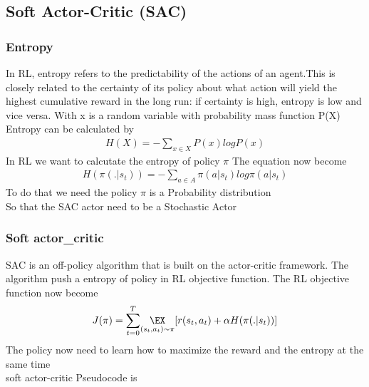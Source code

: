 \subsection{Soft Actor-Critic (SAC)}
\subsubsection{Entropy}
    In RL, entropy refers to the predictability of the actions of an agent.This is closely related to the certainty of its policy about what action will yield the highest cumulative reward in the long run: if certainty is high, entropy is low and vice versa. With x is a random variable with probability mass function P(X) Entropy can be calculated by\\
    \begin{align}
        H(X) = - \underset{x \in X}{\sum} P(x) log P(x)
    \end{align}
    In RL we want to calcutate the entropy of policy $\pi$ The equation now become\\
    \begin{align}
        H(\pi(.|s_t)) = - \underset{a \in A}{\sum} \pi(a|s_t)log\pi(a|s_t)
    \end{align}
    To do that we need the policy $\pi$ is a Probability distribution \\
    So that the SAC actor need to be a Stochastic Actor
\subsubsection{Soft actor_critic}
    SAC is an off-policy algorithm that is built on the actor-critic framework. The algorithm push a entropy of policy in RL objective function. The RL objective function now become\\
    \begin{align}
        J(\pi) =\overset{T}{\underset{t=0}{\sum}}\underset{(s_t,a_t) \sim \pi}{\EX}[r(s_t,a_t) + \alpha H(\pi(.|s_t))]
    \end{align}
    The policy now need to learn how to maximize the reward and the entropy at the same time\\
    soft actor-critic Pseudocode is\\
    
